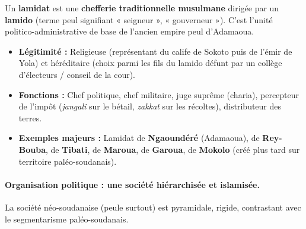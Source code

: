 \documentclass[11pt]{article}
\begin{document}
\begin{definition}[Le Lamidat]
Un \textbf{lamidat} est une \textbf{chefferie traditionnelle musulmane} dirigée par un \textbf{lamido} (terme peul signifiant « seigneur », « gouverneur »). C'est l'unité politico-administrative de base de l'ancien empire peul d'Adamaoua.
\begin{itemize}
    \item \textbf{Légitimité :} Religieuse (représentant du calife de Sokoto puis de l'émir de Yola) et héréditaire (choix parmi les fils du lamido défunt par un collège d'électeurs / conseil de la cour).
    \item \textbf{Fonctions :} Chef politique, chef militaire, juge suprême (charia), percepteur de l'impôt (\emph{jangali} sur le bétail, \emph{zakkat} sur les récoltes), distributeur des terres.
    \item \textbf{Exemples majeurs :} Lamidat de \textbf{Ngaoundéré} (Adamaoua), de \textbf{Rey-Bouba}, de \textbf{Tibati}, de \textbf{Maroua}, de \textbf{Garoua}, de \textbf{Mokolo} (créé plus tard sur territoire paléo-soudanais).
\end{itemize}
\end{definition}

\paragraph{Organisation politique : une société hiérarchisée et islamisée.}
La société néo-soudanaise (peule surtout) est pyramidale, rigide, contrastant avec le segmentarisme paléo-soudanais.
\end{document}
